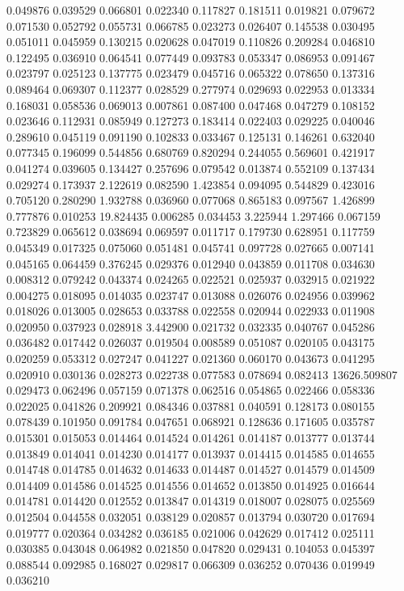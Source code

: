 0.049876
0.039529
0.066801
0.022340
0.117827
0.181511
0.019821
0.079672
0.071530
0.052792
0.055731
0.066785
0.023273
0.026407
0.145538
0.030495
0.051011
0.045959
0.130215
0.020628
0.047019
0.110826
0.209284
0.046810
0.122495
0.036910
0.064541
0.077449
0.093783
0.053347
0.086953
0.091467
0.023797
0.025123
0.137775
0.023479
0.045716
0.065322
0.078650
0.137316
0.089464
0.069307
0.112377
0.028529
0.277974
0.029693
0.022953
0.013334
0.168031
0.058536
0.069013
0.007861
0.087400
0.047468
0.047279
0.108152
0.023646
0.112931
0.085949
0.127273
0.183414
0.022403
0.029225
0.040046
0.289610
0.045119
0.091190
0.102833
0.033467
0.125131
0.146261
0.632040
0.077345
0.196099
0.544856
0.680769
0.820294
0.244055
0.569601
0.421917
0.041274
0.039605
0.134427
0.257696
0.079542
0.013874
0.552109
0.137434
0.029274
0.173937
2.122619
0.082590
1.423854
0.094095
0.544829
0.423016
0.705120
0.280290
1.932788
0.036960
0.077068
0.865183
0.097567
1.426899
0.777876
0.010253
19.824435
0.006285
0.034453
3.225944
1.297466
0.067159
0.723829
0.065612
0.038694
0.069597
0.011717
0.179730
0.628951
0.117759
0.045349
0.017325
0.075060
0.051481
0.045741
0.097728
0.027665
0.007141
0.045165
0.064459
0.376245
0.029376
0.012940
0.043859
0.011708
0.034630
0.008312
0.079242
0.043374
0.024265
0.022521
0.025937
0.032915
0.021922
0.004275
0.018095
0.014035
0.023747
0.013088
0.026076
0.024956
0.039962
0.018026
0.013005
0.028653
0.033788
0.022558
0.020944
0.022933
0.011908
0.020950
0.037923
0.028918
3.442900
0.021732
0.032335
0.040767
0.045286
0.036482
0.017442
0.026037
0.019504
0.008589
0.051087
0.020105
0.043175
0.020259
0.053312
0.027247
0.041227
0.021360
0.060170
0.043673
0.041295
0.020910
0.030136
0.028273
0.022738
0.077583
0.078694
0.082413
13626.509807
0.029473
0.062496
0.057159
0.071378
0.062516
0.054865
0.022466
0.058336
0.022025
0.041826
0.209921
0.084346
0.037881
0.040591
0.128173
0.080155
0.078439
0.101950
0.091784
0.047651
0.068921
0.128636
0.171605
0.035787
0.015301
0.015053
0.014464
0.014524
0.014261
0.014187
0.013777
0.013744
0.013849
0.014041
0.014230
0.014177
0.013937
0.014415
0.014585
0.014655
0.014748
0.014785
0.014632
0.014633
0.014487
0.014527
0.014579
0.014509
0.014409
0.014586
0.014525
0.014556
0.014652
0.013850
0.014925
0.016644
0.014781
0.014420
0.012552
0.013847
0.014319
0.018007
0.028075
0.025569
0.012504
0.044558
0.032051
0.038129
0.020857
0.013794
0.030720
0.017694
0.019777
0.020364
0.034282
0.036185
0.021006
0.042629
0.017412
0.025111
0.030385
0.043048
0.064982
0.021850
0.047820
0.029431
0.104053
0.045397
0.088544
0.092985
0.168027
0.029817
0.066309
0.036252
0.070436
0.019949
0.036210
